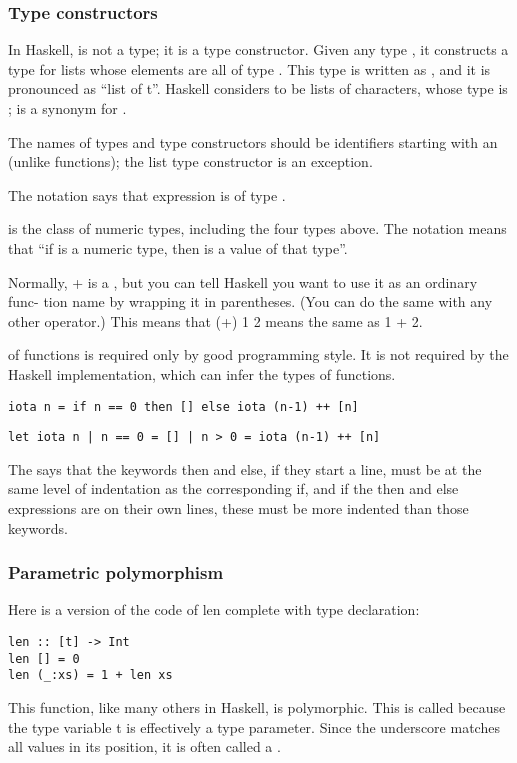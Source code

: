 \subsubsection{Type constructors}
In Haskell,  is not a type; it is a type constructor.
Given any type , it constructs a type for lists
whose elements are all of type . This type is written as \e{[t]}, and it is pronounced as “list of t”.
Haskell considers  to be lists of characters,
whose type is \e{[Char]};  is a synonym for
\e{[Char]}.

The names of types and type constructors should
be identifiers starting with an  (unlike functions); the
list type constructor is an exception.

The notation  says that expression  is of type
. 

 is the class of numeric
types, including the four types above.
The notation  means that “if
 is a numeric type, then  is a value of that type”.

Normally, + is a , but you can
tell Haskell you want to use it as an ordinary func-
tion name by wrapping it in parentheses. (You can
do the same with any other operator.) This means
that (+) 1 2 means the same as 1 + 2.

 of functions is required only by
good programming style. It is not required by the
Haskell implementation, which can infer the types
of functions.
\begin{lstlisting}
iota n = if n == 0 then [] else iota (n-1) ++ [n]
\end{lstlisting}
\begin{lstlisting}
let iota n | n == 0 = [] | n > 0 = iota (n-1) ++ [n]
\end{lstlisting}

The  says that the keywords then and else, if they start a
line, must be at the same level of indentation
as the corresponding if, and if the then and else expressions are on their
own lines, these must be more indented than
those keywords.

\subsubsection{Parametric polymorphism}
Here is a version of the code of len complete with
type declaration:
\begin{lstlisting}
len :: [t] -> Int
len [] = 0
len (_:xs) = 1 + len xs
\end{lstlisting}
This function, like many others in Haskell, is polymorphic. This is called  because the type variable t is effectively a type parameter.
Since the underscore matches all values in its position, it is often called a .

